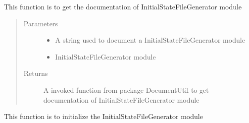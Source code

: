\documentclass[letterpaper,10pt,english]{sphinxmanual}
\begin{document}
\begin{fulllineitems}
\begin{fulllineitems}
\end{fulllineitems}


\begin{fulllineitems}
\label{\detokenize{AgentTools.GenericModelAgent:AgentTools.GenericModelAgent.InitialStateFileGenerator.InitialStateFileGenerator.get_documentation}}
This function is to get the documentation of InitialStateFileGenerator module
\begin{quote}\begin{description}
\item[{Parameters}] \leavevmode\begin{itemize}
\item {} 
 \textendash{} A string used to document a InitialStateFileGenerator module

\item {} 
 \textendash{} InitialStateFileGenerator module

\end{itemize}

\item[{Returns}] \leavevmode
A invoked function from package DocumentUtil to get documentation of InitialStateFileGenerator module

\end{description}\end{quote}

\end{fulllineitems}


\end{fulllineitems}


\begin{fulllineitems}
\label{\detokenize{AgentTools.GenericModelAgent:AgentTools.GenericModelAgent.InitialStateFileGenerator.initialize}}
This function is to initialize the InitialStateFileGenerator module

\end{fulllineitems}
\end{document}
